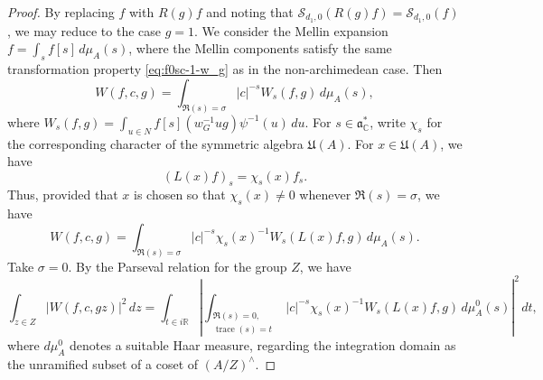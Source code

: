 \documentclass[reqno]{amsart}
\DeclareMathOperator{\trace}{trace}
\theoremstyle{plain} \newtheorem{theorem} {Theorem}
\theoremstyle{definition} \newtheorem{definition} [theorem] {Definition}
\theoremstyle{itplain} %
\numberwithin{equation}{section}
\numberwithin{theorem}{section}
\begin{document}
\begin{proof}
  By replacing $f$ with $R(g) f$ and noting that $\mathcal{S}_{d_1,0}(R(g) f) = \mathcal{S}_{d_1,0}(f)$, we may reduce to the case $g = 1$.  We consider the Mellin expansion $f = \int_s f[s] \, d \mu_A(s)$, where the Mellin components satisfy the same transformation property \eqref{eq:f0sc-1-w_g} as in the non-archimedean case.  Then
\begin{equation*}
  W(f,c,g) =
  \int _{\Re(s) = \sigma}
  |c|^{-s} W_s(f,g) \, d \mu_A(s),
\end{equation*}
where $W_s(f,g) = \int _{u \in N} f[s](w^{-1}_G u g) \psi^{-1}(u) \, d u$.  For $s \in \mathfrak{a}_{\mathbb{C}}^*$, write $\chi_s$ for the corresponding character of the symmetric algebra $\mathfrak{U}(A)$.  For $x \in \mathfrak{U}(A)$, we have
\begin{equation*}
  (L(x) f)_s = \chi_s(x) f_s.
\end{equation*}
Thus, provided that $x$ is chosen so that $\chi_s(x) \neq 0$ whenever $\Re(s) = \sigma$, we have
\begin{equation}\label{eq:wf-c-g}
  W(f,c,g) =
  \int _{\Re(s) = \sigma}
  |c|^{-s} \chi_s(x)^{-1} W_s(L(x) f,g) \, d \mu_A(s).
\end{equation}
Take $\sigma = 0$.  By the Parseval relation for the group $Z$, we have
\begin{equation*}
  \int _{z \in Z} |W(f, c, g z)|^2 \, d z
  =
  \int _{t \in i \mathbb{R} }
  \left\lvert
    \int _{
      \substack{
        \Re(s) = 0,  \\
        \trace(s) = t
      }
    }
    |c|^{-s} \chi_s(x)^{-1} W_s(L(x) f, g ) \, d \mu_A^0(s)
  \right\rvert^2
  \, d t,  
\end{equation*}
where $d \mu_A^0$ denotes a suitable Haar measure, regarding the integration domain as the unramified subset of a coset of $(A/Z)^\wedge$.


\end{proof}
\end{document}
